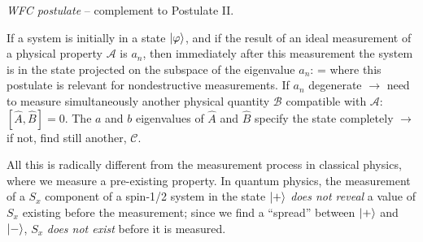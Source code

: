 \documentclass[12pt]{article}
\begin{document}
\emph{WFC postulate} -- complement to Postulate II.

If a system is initially in a state $\ket{\varphi}$,
and if the result of an ideal measurement
of a physical property $\mathcal{A}$ is $a_n$, then
immediately after this measurement the
system is in the state projected on the
subspace of the eigenvalue $a_n$:
\be
\ket{\varphi} \to \ket{\psi} = 
\ee
where this postulate is relevant for nondestructive measurements.
If $a_n$ degenerate $\to$ need to measure
simultaneously another physical
quantity $\mathcal{B}$ compatible with
$\mathcal{A}$: $[\hat{A},\hat{B}] = 0$.
The $a$ and $b$ eigenvalues of $\hat{A}$ and $\hat{B}$ specify the state completely $\to$ if not, find still another, $\mathcal{C}$.


All this is radically different from the measurement 
process in classical physics, where we measure a pre-existing property.
In quantum physics, the measurement of
a $S_x$ component of a spin-1/2 system
in the state $\ket{+}$ \emph{does not reveal} a value
of $S_x$ existing before the measurement;
since we find a ``spread'' between $\ket{+}$ and $\ket{-}$,
$S_x$ \emph{does not exist} before it is measured.
\end{document}
